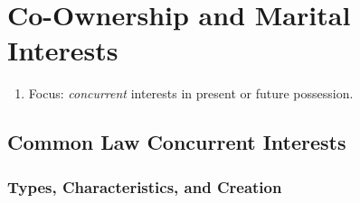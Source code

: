 \section{Co-Ownership and Marital Interests}

\begin{enumerate}
    \item Focus: \emph{concurrent} interests in present or future possession.
\end{enumerate}

\subsection{Common Law Concurrent Interests}

\subsubsection{Types, Characteristics, and Creation}

